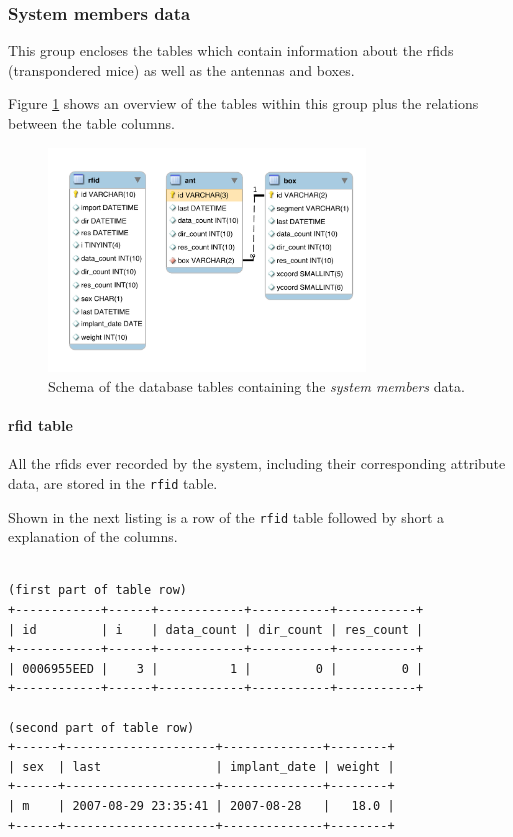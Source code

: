 \subsubsection{System members data}
\label{subsubsec:system_members_tables}

This group encloses the tables which contain information about the rfids (transpondered mice) as well as the antennas and boxes.

Figure \ref{fig:system_members} shows an overview of the tables within this group plus the relations between the table columns. 

\begin{figure}[htpb]
\begin{center}
  \includegraphics[width=0.75\textwidth]{assets/pdf/system_members_schema.pdf}
  \caption[Schema of database tables with system member data]{Schema of the database tables containing the \textit{system members} data.}
  \label{fig:system_members}
\end{center}
\end{figure}

\paragraph{rfid table}
\label{para:rfid_table}

All the rfids ever recorded by the system, including their corresponding attribute data, are stored in the \lstinline|rfid| table.

Shown in the next listing is a row of the \lstinline|rfid| table followed by short a explanation of the columns.
\codescript
{}
\begin{lstlisting}[frame=none]

(first part of table row)
+------------+------+------------+-----------+-----------+
| id         | i    | data_count | dir_count | res_count |
+------------+------+------------+-----------+-----------+
| 0006955EED |    3 |          1 |         0 |         0 |
+------------+------+------------+-----------+-----------+

(second part of table row)
+------+---------------------+--------------+--------+
| sex  | last                | implant_date | weight |
+------+---------------------+--------------+--------+
| m    | 2007-08-29 23:35:41 | 2007-08-28   |   18.0 |
+------+---------------------+--------------+--------+

\end{lstlisting}

